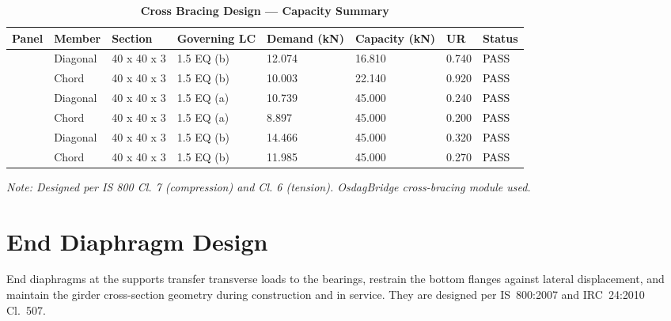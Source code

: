 \documentclass[12pt,a4paper]{report}
\numberwithin{table}{chapter}
\numberwithin{figure}{chapter}
\begin{document}
\vspace{1em}
\begin{longtable}{|C{2.0cm}|L{1.8cm}|C{2.2cm}|C{3.0cm}|C{1.8cm}|C{1.8cm}|C{1.2cm}|C{1.8cm}|}
\caption{\textbf{Cross Bracing Design --- Capacity Summary}}
\hline
\textbf{Panel} & \textbf{Member} & \textbf{Section} & \textbf{Governing LC} & \textbf{Demand (kN)} & \textbf{Capacity (kN)} & \textbf{UR} & \textbf{Status} \\[6pt]
\hline
{} & Diagonal & 40 x 40 x 3 & 1.5 EQ (b) & 12.074 & 16.810 & 0.740 & \textcolor{black}{PASS} \\[6pt]
 & Chord & 40 x 40 x 3 & 1.5 EQ (b) & 10.003 & 22.140 & 0.920 & \textcolor{black}{PASS} \\[6pt]
\hline
{} & Diagonal & 40 x 40 x 3 & 1.5 EQ (a) & 10.739 & 45.000 & 0.240 & \textcolor{black}{PASS} \\[6pt]
 & Chord & 40 x 40 x 3 & 1.5 EQ (a) & 8.897 & 45.000 & 0.200 & \textcolor{black}{PASS} \\[6pt]
\hline
{} & Diagonal & 40 x 40 x 3 & 1.5 EQ (b) & 14.466 & 45.000 & 0.320 & \textcolor{black}{PASS} \\[6pt]
 & Chord & 40 x 40 x 3 & 1.5 EQ (b) & 11.985 & 45.000 & 0.270 & \textcolor{black}{PASS} \\[6pt]
\hline
\end{longtable}
\noindent\textit{Note: Designed per IS 800 Cl. 7 (compression) and Cl. 6 (tension). OsdagBridge cross-bracing module used.}

\section{End Diaphragm Design}
\label{sec:end-diaphragm}

End diaphragms at the supports transfer transverse loads to the bearings, restrain the bottom flanges against lateral displacement, and maintain the girder cross-section geometry during construction and in service. They are designed per IS~800:2007 and IRC~24:2010 Cl.~507.

\vspace{1em}

\vspace{0.4em}
\noindent
\setlength{\tabcolsep}{4pt}
\setlength{\LTleft}{0pt}
\setlength{\LTright}{\fill}
\end{document}
